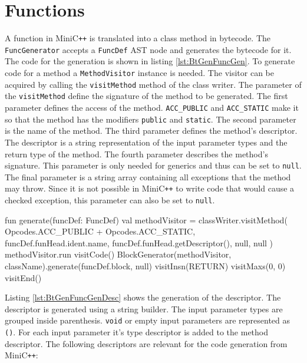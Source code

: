 \section{Functions}

A function in MiniC\verb|++| is translated into a class method in bytecode. The \verb|FuncGenerator| accepts a \verb|FuncDef| AST node and generates the bytecode for it. The code for the generation is shown in listing \ref{lst:BtGenFuncGen}. To generate code for a method a \verb|MethodVisitor| instance is needed. The visitor can be acquired by calling the \verb|visitMethod| method of the class writer. The parameter of the \verb|visitMethod| define the signature of the method to be generated. The first parameter defines the access of the method. \verb|ACC_PUBLIC| and \verb|ACC_STATIC| make it so that the method has the modifiers \verb|public| and \verb|static|. The second parameter is the name of the method. The third parameter defines the method's descriptor. The descriptor is a string representation of the input parameter types and the return type of the method. The fourth parameter describes the method's signature. This parameter is only needed for generics and thus can be set to \verb|null|. The final parameter is a string array containing all exceptions that the method may throw. Since  it is not possible in MiniC\verb|++| to write code that would cause a checked exception, this parameter can also be set to \verb|null|. 

\begin{KotlinCode}[float,numbers=none,caption=Code for the bytecode generation of the \texttt{FuncDef} node., label=lst:BtGenFuncGen]
fun generate(funcDef: FuncDef) {
    val methodVisitor = classWriter.visitMethod(
        Opcodes.ACC_PUBLIC + Opcodes.ACC_STATIC,
        funcDef.funHead.ident.name,
        funcDef.funHead.getDescriptor(),
        null,
        null
    )
    methodVisitor.run {
        visitCode()
        BlockGenerator(methodVisitor, className).generate(funcDef.block, null)
        visitInsn(RETURN)
        visitMaxs(0, 0)
        visitEnd()
    }
}
\end{KotlinCode}


Listing \ref{lst:BtGenFuncGenDesc} shows the generation of the descriptor. The descriptor is generated using a string builder. The input parameter types are grouped inside parenthesis. \verb|void| or empty input parameters are represented as \verb|()|. For each input parameter it's type descriptor is added to the method descriptor. The following descriptors are relevant for the code generation from MiniC\verb|++|:

